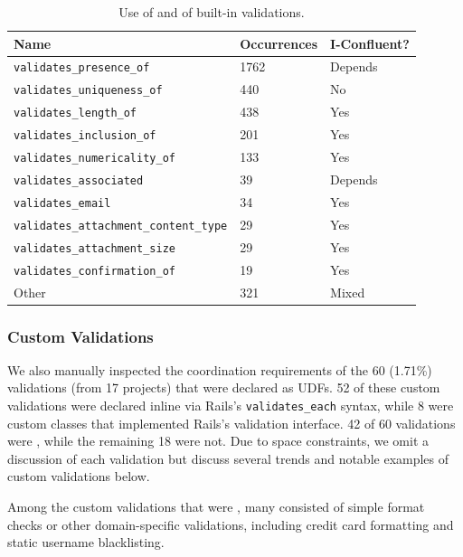 \begin{table}
\begin{center}
\small
\begin{tabular}{|l l l |}
\hline
Name & Occurrences & I-Confluent?\\\hline
\texttt{validates\_presence\_of} & 1762 & Depends\\
\texttt{validates\_uniqueness\_of} & 440 & No \\
\texttt{validates\_length\_of} & 438 & Yes \\
\texttt{validates\_inclusion\_of} & 201 & Yes\\
\texttt{validates\_numericality\_of} & 133 & Yes \\
\texttt{validates\_associated} & 39 & Depends\\
\texttt{validates\_email} & 34 & Yes \\
\texttt{validates\_attachment\_content\_type} & 29 & Yes \\
\texttt{validates\_attachment\_size} & 29 & Yes \\
\texttt{validates\_confirmation\_of} & 19 & Yes \\
Other & 321 & Mixed \\\hline
\end{tabular}
\end{center}\vspace{-.5em}
\caption{Use of and \iconfluence of built-in validations.}
\label{table:builtins}
\end{table}

\subsubsection{Custom Validations}

We also manually inspected the coordination requirements of the 60
(1.71\%) validations (from 17 projects) that were declared as UDFs. 52
of these custom validations were declared inline via Rails's
\texttt{validates\_each} syntax, while 8 were custom classes that
implemented Rails's validation interface. 42 of 60 validations were
\iconfluent, while the remaining 18 were not. Due to space
constraints, we omit a discussion of each validation but discuss
several trends and notable examples of custom validations below.

Among the custom validations that were \iconfluent, many consisted of
simple format checks or other domain-specific validations, including
credit card formatting and static username blacklisting.

